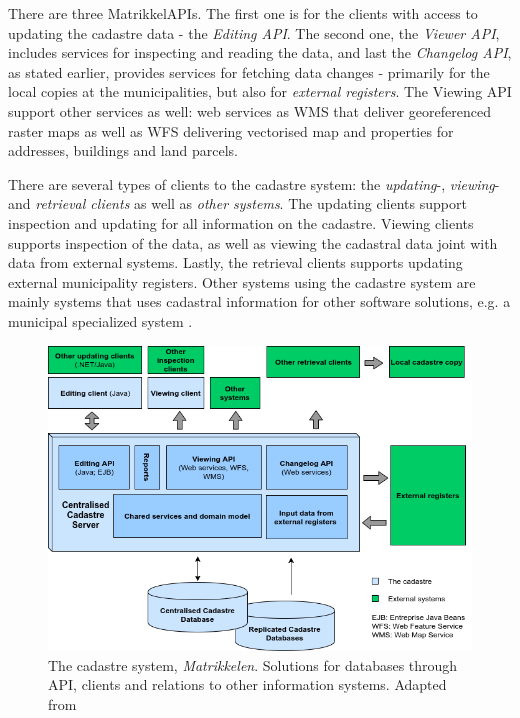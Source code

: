 There are three MatrikkelAPIs. The first one is for the clients with access to updating the cadastre data - the \textit{Editing API}. The second one, the \textit{Viewer API}, includes services for inspecting and reading the data, and last the \textit{Changelog API}, as stated earlier, provides services for fetching data changes - primarily for the local copies at the municipalities, but also for \textit{external registers}.  The Viewing API support other services as well: web services as WMS that deliver georeferenced raster maps
as well as WFS delivering vectorised map	and properties for addresses, buildings and land parcels. 

There are several types of clients to the cadastre system: the \textit{updating}-, \textit{viewing}- and \textit{retrieval clients} as well as \textit{other systems}. The updating clients support inspection and updating for all information on the cadastre. Viewing clients supports inspection of the data, as well as viewing the cadastral data joint with data from external systems. Lastly, the retrieval clients supports updating external municipality registers. Other systems using the cadastre system are mainly systems that uses cadastral information for other software solutions, e.g. a municipal specialized system \citep[p.~337-338]{Matrikkelavdelingen2017}.
 

\begin{figure}[H]
	\centering
	\includegraphics[scale=0.5]{img/matrikkelSYS}
	\caption{The cadastre system, \textit{Matrikkelen}. Solutions for databases through API, clients and relations to other information systems. Adapted from \citep[p.~337]{Matrikkelavdelingen2017} }
	\label{fig:matr}
\end{figure}


